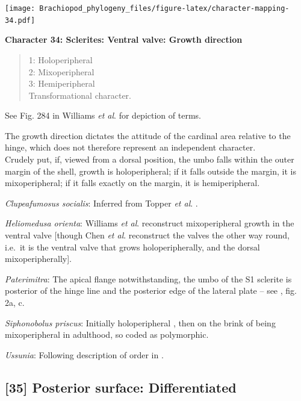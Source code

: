 \documentclass[openany]{book}
\theoremstyle{definition}
\theoremstyle{definition}
\theoremstyle{definition}
\theoremstyle{remark}
\begin{document}
\texttt{[image: Brachiopod\_phylogeny\_files/figure-latex/character-mapping-34.pdf]}

\textbf{Character 34: Sclerites: Ventral valve: Growth direction}

\begin{quote}
1: Holoperipheral\\
2: Mixoperipheral\\
3: Hemiperipheral\\
Transformational character.
\end{quote}

See Fig. 284 in Williams \emph{et al}.
\citeyearpar{Williams1997Introduction} for depiction of terms.

The growth direction dictates the attitude of the cardinal area relative
to the hinge, which does not therefore represent an independent
character.\\
Crudely put, if, viewed from a dorsal position, the umbo falls within
the outer margin of the shell, growth is holoperipheral; if it falls
outside the margin, it is mixoperipheral; if it falls exactly on the
margin, it is hemiperipheral.

\hypertarget{Clupeafumosus_socialis-coding-34}{}
\emph{Clupeafumosus socialis}: Inferred from Topper \emph{et al}.
\citeyearpar{Topper2013Reappraisalof}.

\hypertarget{Heliomedusa_orienta-coding-34}{}
\emph{Heliomedusa orienta}: Williams \emph{et al}.
\citeyearpar[2007]{Williams2000LinguliformeaCraniiformea} reconstruct
mixoperipheral growth in the ventral valve {[}though Chen \emph{et al}.
\citeyearpar{Chen2007Reinterpretationof} reconstruct the valves the
other way round, i.e.~it is the ventral valve that grows
holoperipherally, and the dorsal mixoperipherally{]}.

\hypertarget{Paterimitra-coding-34}{}
\emph{Paterimitra}: The apical flange notwithstanding, the umbo of the
S1 sclerite is posterior of the hinge line and the posterior edge of the
lateral plate -- see \citet{Larsson2014iPaterimitra}, fig. 2a, c.

\hypertarget{Siphonobolus_priscus-coding-34}{}
\emph{Siphonobolus priscus}: Initially holoperipheral
\citep[p.~159]{Popov2009Earlyontogeny}, then on the brink of being
mixoperipheral in adulthood, so coded as polymorphic.

\hypertarget{Ussunia-coding-34}{}
\emph{Ussunia}: Following description of order in
\citet{Williams2000LinguliformeaCraniiformea}.

\subsection*{{[}35{]} Posterior surface:
Differentiated}\label{posterior-surface-differentiated-1}
\end{document}
